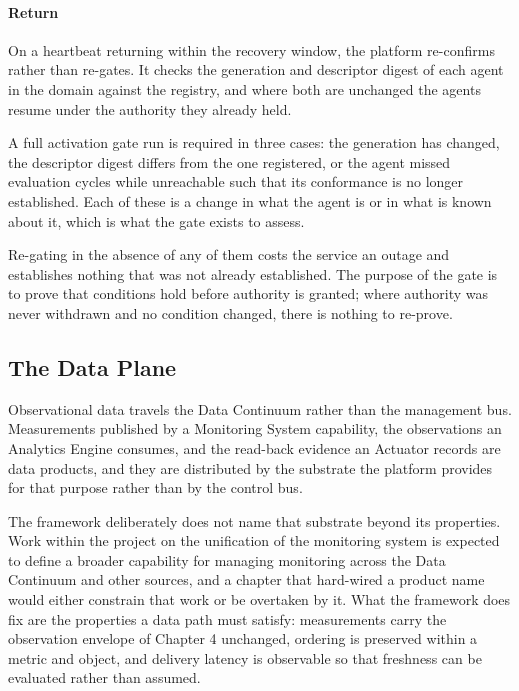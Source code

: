 \hypertarget{return}{%
\paragraph{Return}\label{return}}

On a heartbeat returning within the recovery window, the platform
re-confirms rather than re-gates. It checks the generation and
descriptor digest of each agent in the domain against the registry, and
where both are unchanged the agents resume under the authority they
already held.

A full activation gate run is required in three cases: the generation
has changed, the descriptor digest differs from the one registered, or
the agent missed evaluation cycles while unreachable such that its
conformance is no longer established. Each of these is a change in what
the agent is or in what is known about it, which is what the gate exists
to assess.

Re-gating in the absence of any of them costs the service an outage and
establishes nothing that was not already established. The purpose of the
gate is to prove that conditions hold before authority is granted; where
authority was never withdrawn and no condition changed, there is nothing
to re-prove.

\hypertarget{the-data-plane}{%
\subsection{The Data Plane}\label{the-data-plane}}

Observational data travels the Data Continuum rather than the management
bus. Measurements published by a Monitoring System capability, the
observations an Analytics Engine consumes, and the read-back evidence an
Actuator records are data products, and they are distributed by the
substrate the platform provides for that purpose rather than by the
control bus.

The framework deliberately does not name that substrate beyond its
properties. Work within the project on the unification of the monitoring
system is expected to define a broader capability for managing
monitoring across the Data Continuum and other sources, and a chapter
that hard-wired a product name would either constrain that work or be
overtaken by it. What the framework does fix are the properties a data
path must satisfy: measurements carry the observation envelope of
Chapter 4 unchanged, ordering is preserved within a metric and object,
and delivery latency is observable so that freshness can be evaluated
rather than assumed.

